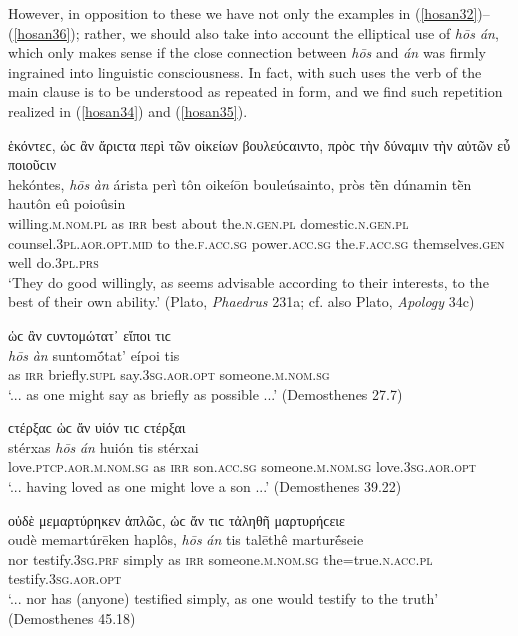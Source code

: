 However, in opposition to these we have not only the examples in (\ref{hosan32})--(\ref{hosan36}); rather, we should also take into account the elliptical use of \emph{hōs án}, which only makes sense if the close connection between \emph{hōs} and \emph{án} was firmly ingrained into linguistic consciousness. In fact, with such uses the verb of the main clause is to be understood as repeated in  form, and we find such repetition realized in (\ref{hosan34}) and (\ref{hosan35}).

\begin{exe}
\ex ἑκόντεϲ, ὡϲ ἂν ἄριϲτα περὶ τῶν οἰκείων βουλεύϲαιντο, πρὸϲ τὴν δύναμιν τὴν αὑτῶν εὖ ποιοῦϲιν\\
\gll hekóntes, \emph{hōs} \emph{àn} árista perì tôn oikeíōn bouleúsainto, pròs tḕn dúnamin tḕn hautôn eû poioûsin\\
willing.\textsc{m.nom.pl} as \textsc{irr} best about the.\textsc{n.gen.pl} domestic.\textsc{n.gen.pl} counsel.\textsc{3pl.aor.opt.mid} to the.\textsc{f.acc.sg} power.\textsc{acc.sg} the.\textsc{f.acc.sg} themselves.\textsc{gen} well do.\textsc{3pl.prs}\\
\trans `They do good willingly, as seems advisable according to their interests, to the best of their own ability.' (Plato, \textit{Phaedrus} 231a; cf. also Plato, \textit{Apology} 34c)
\label{hosan32}
\end{exe}

\begin{exe}
\ex ὡϲ ἂν ϲυντομώτατ᾽ εἴποι τιϲ\\
\gll \emph{hōs} \emph{àn} suntomṓtat' eípoi tis\\
as \textsc{irr} briefly.\textsc{supl} say.\textsc{3sg.aor.opt} someone.\textsc{m.nom.sg}\\
\trans `... as one might say as briefly as possible ...' (Demosthenes 27.7)
\label{hosan33}
\end{exe}

\begin{exe}
\ex ϲτέρξαϲ ὡϲ ἄν υἱόν τιϲ ϲτέρξαι\\
\gll stérxas \emph{hōs} \emph{án} huión tis stérxai\\
love.\textsc{ptcp.aor.m.nom.sg} as \textsc{irr} son.\textsc{acc.sg}
someone.\textsc{m.nom.sg} love.\textsc{3sg.aor.opt}\\
\trans `... having loved as one might love a son ...' (Demosthenes 39.22)
\label{hosan34}
\end{exe}

\begin{exe}
\ex οὐδὲ μεμαρτύρηκεν ἁπλῶϲ, ὡϲ ἄν τιϲ τἀληθῆ μαρτυρήϲειε\\
\gll oudè memartúrēken haplôs, \emph{hōs} \emph{án} tis talēthê marturḗseie\\
nor testify.\textsc{3sg.prf} simply as \textsc{irr} someone.\textsc{m.nom.sg} the=true.\textsc{n.acc.pl} testify.\textsc{3sg.aor.opt}\\
\trans `... nor has (anyone) testified simply, as one would testify to the truth' (Demosthenes 45.18)
\label{hosan35}
\end{exe}

